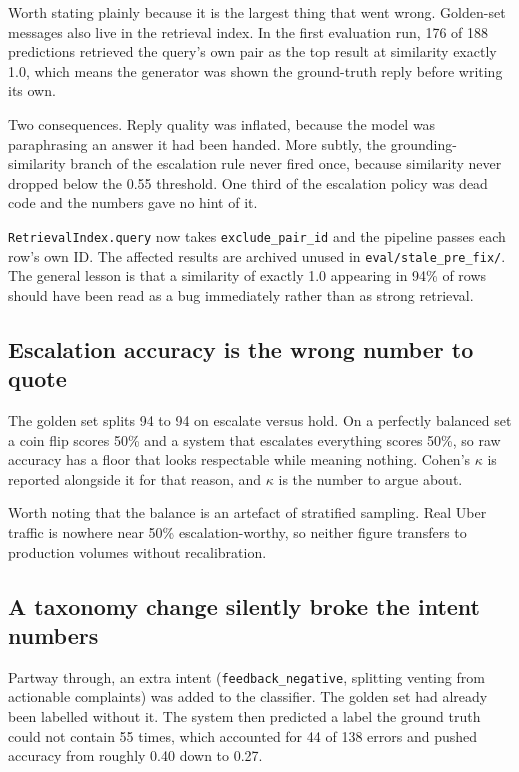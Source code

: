 \documentclass[11pt,a4paper]{article}
\begin{document}
Worth stating plainly because it is the largest thing that went wrong. Golden-set
messages also live in the retrieval index. In the first evaluation run, 176 of 188
predictions retrieved the query's own pair as the top result at similarity exactly 1.0,
which means the generator was shown the ground-truth reply before writing its own.

Two consequences. Reply quality was inflated, because the model was paraphrasing an
answer it had been handed. More subtly, the grounding-similarity branch of the escalation
rule never fired once, because similarity never dropped below the 0.55 threshold. One
third of the escalation policy was dead code and the numbers gave no hint of it.

\texttt{RetrievalIndex.query} now takes \texttt{exclude\_pair\_id} and the pipeline
passes each row's own ID. The affected results are archived unused in
\texttt{eval/stale\_pre\_fix/}. The general lesson is that a similarity of exactly 1.0
appearing in 94\% of rows should have been read as a bug immediately rather than as
strong retrieval.

\subsection{Escalation accuracy is the wrong number to quote}

The golden set splits 94 to 94 on escalate versus hold. On a perfectly balanced set a
coin flip scores 50\% and a system that escalates everything scores 50\%, so raw accuracy
has a floor that looks respectable while meaning nothing. Cohen's $\kappa$ is reported
alongside it for that reason, and $\kappa$ is the number to argue about.

Worth noting that the balance is an artefact of stratified sampling. Real Uber traffic is
nowhere near 50\% escalation-worthy, so neither figure transfers to production volumes
without recalibration.

\subsection{A taxonomy change silently broke the intent numbers}

Partway through, an extra intent (\texttt{feedback\_negative}, splitting venting from
actionable complaints) was added to the classifier. The golden set had already been
labelled without it. The system then predicted a label the ground truth could not contain
55 times, which accounted for 44 of 138 errors and pushed accuracy from roughly 0.40 down
to 0.27.
\end{document}
